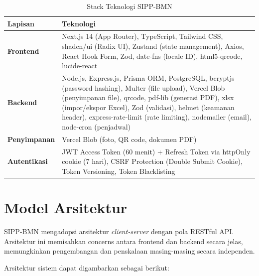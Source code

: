 \documentclass[
  12pt,
  a4paper,
  oneside,
  final
]{report}
\begin{document}
\begin{table}[!htbp]
  \centering
  \caption{Stack Teknologi SIPP-BMN}
  \label{tab:tech-stack}
  \begin{tabularx}{\textwidth}{L L}
    \toprule
    \textbf{Lapisan} & \textbf{Teknologi} \\
    \midrule
    {\bfseries Frontend}  & Next.js 14 (App Router), TypeScript, Tailwind CSS,
                           shadcn/ui (Radix UI), Zustand (state management),
                           Axios, React Hook Form, Zod, date-fns (locale ID),
                           html5-qrcode, lucide-react \\
    {\bfseries Backend}   & Node.js, Express.js, Prisma ORM, PostgreSQL,
                           bcryptjs (password hashing), Multer (file upload),
                           Vercel Blob (penyimpanan file), qrcode,
                           pdf-lib (generasi PDF), xlsx (impor/ekspor Excel),
                           Zod (validasi), helmet (keamanan header),
                           express-rate-limit (rate limiting),
                           nodemailer (email), node-cron (penjadwal) \\
    {\bfseries Penyimpanan} & Vercel Blob (foto, QR code, dokumen PDF) \\
    {\bfseries Autentikasi} & JWT Access Token (60 menit) +
                              Refresh Token via httpOnly cookie (7 hari),
                              CSRF Protection (Double Submit Cookie),
                              Token Versioning, Token Blacklisting \\
    \bottomrule
  \end{tabularx}
\end{table}

\section{Model Arsitektur}
SIPP-BMN mengadopsi arsitektur {\it client-server} dengan pola
RESTful API. Arsitektur ini memisahkan concerns antara frontend
dan backend secara jelas, memungkinkan pengembangan dan penskalaan
masing-masing secara independen.

Arsitektur sistem dapat digambarkan sebagai berikut:
\end{document}
